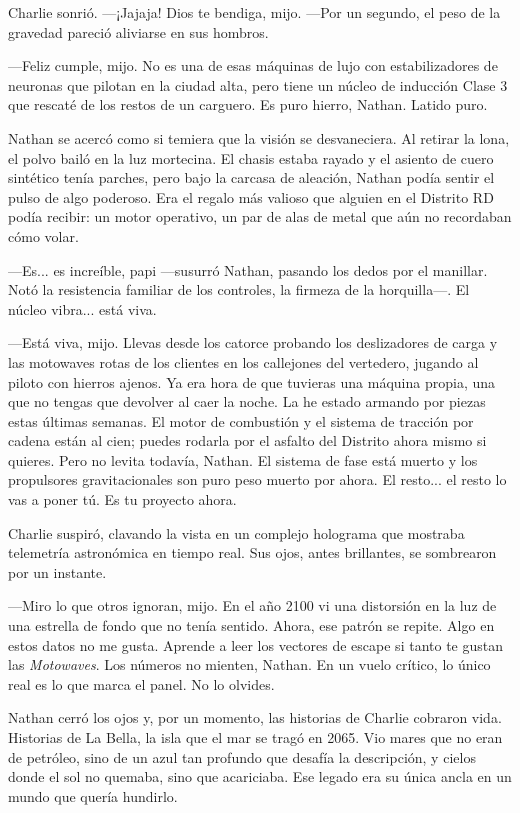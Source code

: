 \documentclass[12pt,a4paper]{book}
\begin{document}
Charlie sonrió. ---¡Jajaja! Dios te bendiga, mijo. ---Por un segundo, el peso de la gravedad pareció aliviarse en sus hombros.

---Feliz cumple, mijo. No es una de esas máquinas de lujo con estabilizadores de neuronas que pilotan en la ciudad alta, pero tiene un núcleo de inducción Clase 3 que rescaté de los restos de un carguero. Es puro hierro, Nathan. Latido puro.

Nathan se acercó como si temiera que la visión se desvaneciera. Al retirar la lona, el polvo bailó en la luz mortecina. El chasis estaba rayado y el asiento de cuero sintético tenía parches, pero bajo la carcasa de aleación, Nathan podía sentir el pulso de algo poderoso. Era el regalo más valioso que alguien en el Distrito RD podía recibir: un motor operativo, un par de alas de metal que aún no recordaban cómo volar.

---Es... es increíble, papi ---susurró Nathan, pasando los dedos por el manillar. Notó la resistencia familiar de los controles, la firmeza de la horquilla---. El núcleo vibra... está viva.

---Está viva, mijo. Llevas desde los catorce probando los deslizadores de carga y las motowaves rotas de los clientes en los callejones del vertedero, jugando al piloto con hierros ajenos. Ya era hora de que tuvieras una máquina propia, una que no tengas que devolver al caer la noche. La he estado armando por piezas estas últimas semanas. El motor de combustión y el sistema de tracción por cadena están al cien; puedes rodarla por el asfalto del Distrito ahora mismo si quieres. Pero no levita todavía, Nathan. El sistema de fase está muerto y los propulsores gravitacionales son puro peso muerto por ahora. El resto... el resto lo vas a poner tú. Es tu proyecto ahora.

Charlie suspiró, clavando la vista en un complejo holograma que mostraba telemetría astronómica en tiempo real. Sus ojos, antes brillantes, se sombrearon por un instante.

---Miro lo que otros ignoran, mijo. En el año 2100 vi una distorsión en la luz de una estrella de fondo que no tenía sentido. Ahora, ese patrón se repite. Algo en estos datos no me gusta. Aprende a leer los vectores de escape si tanto te gustan las \textit{Motowaves}. Los números no mienten, Nathan. En un vuelo crítico, lo único real es lo que marca el panel. No lo olvides.

Nathan cerró los ojos y, por un momento, las historias de Charlie cobraron vida. Historias de La Bella, la isla que el mar se tragó en 2065. Vio mares que no eran de petróleo, sino de un azul tan profundo que desafía la descripción, y cielos donde el sol no quemaba, sino que acariciaba. Ese legado era su única ancla en un mundo que quería hundirlo.
\end{document}
